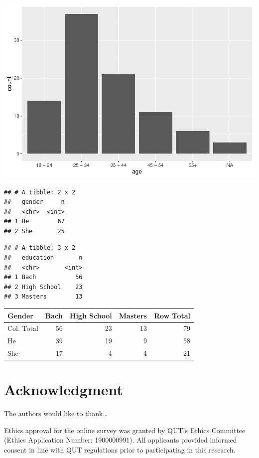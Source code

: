 \documentclass[conference,final,]{IEEEtran}
\makeatletter
\def\maxwidth{\ifdim\Gin@nat@width>\linewidth\linewidth
\else\Gin@nat@width\fi}
\let\Oldincludegraphics\includegraphics
\renewcommand{\includegraphics}[1]{\Oldincludegraphics[width=\maxwidth]{#1}}
\makeatother
\begin{document}
\includegraphics{paper_files/figure-latex/demogs-1.pdf}

\begin{verbatim}
## # A tibble: 2 x 2
##   gender     n
##   <chr>  <int>
## 1 He        67
## 2 She       25
\end{verbatim}

\begin{verbatim}
## # A tibble: 3 x 2
##   education       n
##   <chr>       <int>
## 1 Bach           56
## 2 High School    23
## 3 Masters        13
\end{verbatim}

\begin{tabular}{l|r|r|r|r}
\hline
Gender & Bach & High School & Masters & Row Total\\
\hline
Col. Total & 56 & 23 & 13 & 79\\
\hline
He & 39 & 19 & 9 & 58\\
\hline
She & 17 & 4 & 4 & 21\\
\hline
\end{tabular}

\hypertarget{acknowledgment}{%
\section{Acknowledgment}\label{acknowledgment}}

The authors would like to thank\ldots{}

Ethics approval for the online survey was granted by QUT's Ethics
Committee (Ethics Application Number: 1900000991). All applicants
provided informed consent in line with QUT regulations prior to
participating in this research.
\end{document}
